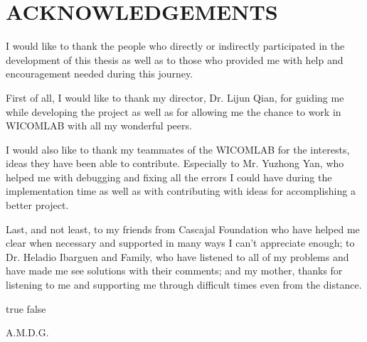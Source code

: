 %
%
%


\chapter*{ACKNOWLEDGEMENTS}

\thispagestyle{plain} %

I would like to thank the people who directly or indirectly participated in the development of this thesis as well as to those who provided me with help and encouragement needed during this journey.

First of all, I would like to thank my director, Dr. Lijun Qian, for guiding me while developing the project as well as for allowing me the chance to work in WICOMLAB with all my wonderful peers. 

I would also like to thank my teammates of the WICOMLAB for the interests, ideas they have been able to contribute. Especially to Mr. Yuzhong Yan, who helped me with debugging and fixing all the errors I could have during the implementation time as well as with contributing with ideas for accomplishing a better project.

Last, and not least, to my friends from Cascajal Foundation who have helped me clear when necessary and supported in many ways I can't appreciate enough; to Dr. Heladio Ibarguen and Family, who have listened to all of my problems and have made me see solutions with their comments; and my mother, thanks for listening to me and supporting me through difficult times even from the distance.

\pagebreak{}

\ifx true false
\vspace*{\fill}
\begin{center}
A.M.D.G.
\end{center}
\vspace*{\fill}
\pagebreak{}
\fi
